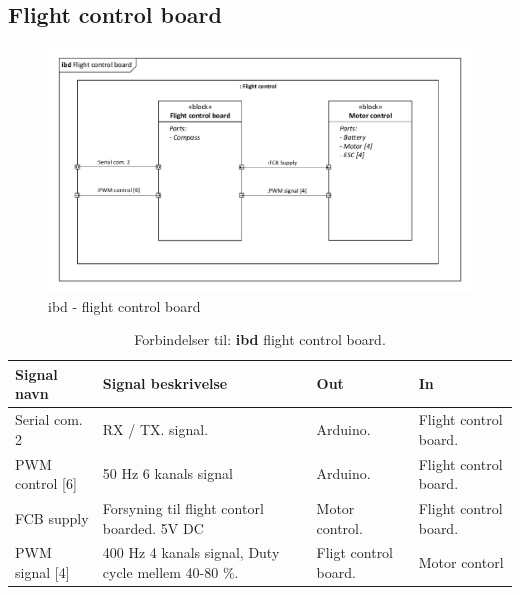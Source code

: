 \subsection{Flight control board}

\begin{figure}[H]
\centering
\includegraphics[width=1\textwidth]{Billeder/IBD/ibd5_flightcontrolboard.pdf}
\caption{ibd - flight control board}
\label{fig:ibd_flightcontrolboard}
\end{figure}

\begin{table}[H]
	\centering
		\begin{tabular}{|p{2.5 cm}|p{5.5 cm}|p{2.5 cm}|p{2.5 cm}|} 
		\hline
			\textbf{Signal navn} 	& \textbf{Signal beskrivelse}		& \textbf{Out} 				& \textbf{In}     \\ \hline
			Serial com. 2 & RX / TX. signal. & Arduino. & Flight control board.			    \\ \hline
			PWM control [6] & 50 Hz 6 kanals signal & Arduino. & Flight control board.				\\ \hline
			FCB supply &  Forsyning til flight contorl boarded. 5V DC & Motor control. & Flight control board.	\\ \hline
			PWM signal [4] & 400 Hz 4 kanals signal, Duty cycle mellem 40-80 $\%$. & Fligt control board. & Motor contorl   \\ \hline 
		\end{tabular}
	\caption{Forbindelser til: \textbf{ibd} flight control board. }
	\label{tab:ibd_Flight_control_board}
\end{table}



